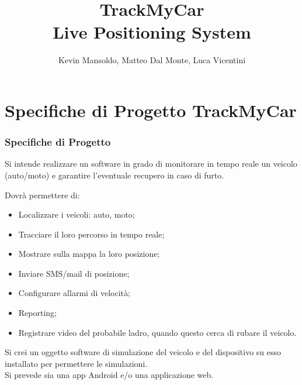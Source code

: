 \documentclass[a4paper,12pt]{beamer}
\begin{document}
\title{\textbf{TrackMyCar \\ Live Positioning System}}

\author{Kevin Mansoldo, Matteo Dal Monte, Luca Vicentini}
\date{}
\maketitle
\pagebreak





\section{Specifiche di Progetto TrackMyCar}
\begin{frame}
\frametitle{Specifiche di Progetto}
Si intende realizzare un software in grado di monitorare in tempo reale un veicolo (auto/moto) e garantire l’eventuale recupero in caso di furto.

Dovrà permettere di:
\begin{itemize}
\item Localizzare i veicoli: auto, moto;
\item Tracciare il loro percorso in tempo reale;
\item Mostrare sulla mappa la loro posizione;
\item Inviare SMS/mail di posizione;
\item Configurare allarmi di velocità;
\item Reporting;
\item Registrare video del probabile ladro, quando questo cerca di rubare il veicolo.
\end{itemize}
Si crei un oggetto software di simulazione del veicolo e del dispositivo su esso installato per permettere le simulazioni.\\
Si prevede sia una app Android e/o una applicazione web.
\end{frame}

\pagebreak
\end{document}
